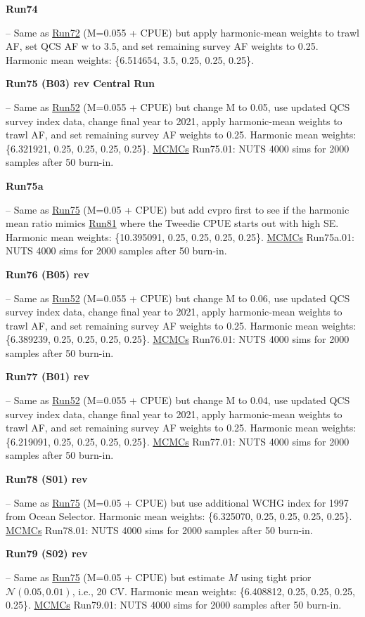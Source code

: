 \hypertarget{R74}{\textbf{Run74}} -- Same as \hyperlink{R72}{Run72} (M=0.055 + CPUE) but apply harmonic-mean weights to trawl AF, set QCS AF w to 3.5, and set remaining survey AF weights to 0.25.  Harmonic mean weights: \{6.514654, 3.5, 0.25, 0.25, 0.25\}.

\hypertarget{R75}{\textbf{Run75 (B03) rev Central Run}} -- Same as \hyperlink{R52}{Run52} (M=0.055 + CPUE) but change M to 0.05, use updated QCS survey index data, change final year to 2021, apply harmonic-mean weights to trawl AF, and set remaining survey AF weights to 0.25.  Harmonic mean weights: \{6.321921, 0.25, 0.25, 0.25, 0.25\}. \underline{MCMCs} Run75.01: NUTS 4000 sims for 2000 samples after 50\pc{} burn-in.

\hypertarget{R75a}{\textbf{Run75a}} -- Same as \hyperlink{R75}{Run75} (M=0.05 + CPUE) but add cvpro first to see if the harmonic mean ratio mimics \hyperlink{R81}{Run81} where the Tweedie CPUE starts out with high SE.  Harmonic mean weights: \{10.395091, 0.25, 0.25, 0.25, 0.25\}. \underline{MCMCs} Run75a.01: NUTS 4000 sims for 2000 samples after 50\pc{} burn-in.

\hypertarget{R76}{\textbf{Run76 (B05) rev}} -- Same as \hyperlink{R52}{Run52} (M=0.055 + CPUE) but change M to 0.06, use updated QCS survey index data, change final year to 2021, apply harmonic-mean weights to trawl AF, and set remaining survey AF weights to 0.25.  Harmonic mean weights: \{6.389239, 0.25, 0.25, 0.25, 0.25\}. \underline{MCMCs} Run76.01: NUTS 4000 sims for 2000 samples after 50\pc{} burn-in.

\hypertarget{R77}{\textbf{Run77 (B01) rev}} -- Same as \hyperlink{R52}{Run52} (M=0.055 + CPUE) but change M to 0.04, use updated QCS survey index data, change final year to 2021, apply harmonic-mean weights to trawl AF, and set remaining survey AF weights to 0.25.  Harmonic mean weights: \{6.219091, 0.25, 0.25, 0.25, 0.25\}. \underline{MCMCs} Run77.01: NUTS 4000 sims for 2000 samples after 50\pc{} burn-in.

\hypertarget{R78}{\textbf{Run78 (S01) rev}} -- Same as \hyperlink{R75}{Run75} (M=0.05 + CPUE) but use additional WCHG index for 1997 from Ocean Selector. Harmonic mean weights: \{6.325070, 0.25, 0.25, 0.25, 0.25\}. \underline{MCMCs} Run78.01: NUTS 4000 sims for 2000 samples after 50\pc{} burn-in.

\hypertarget{R79}{\textbf{Run79 (S02) rev}} -- Same as \hyperlink{R75}{Run75} (M=0.05 + CPUE) but estimate $M$ using tight prior $\mathcal{N}(0.05,0.01)$, i.e., 20\pc{} CV.  Harmonic mean weights: \{6.408812, 0.25, 0.25, 0.25, 0.25\}. \underline{MCMCs} Run79.01: NUTS 4000 sims for 2000 samples after 50\pc{} burn-in.

